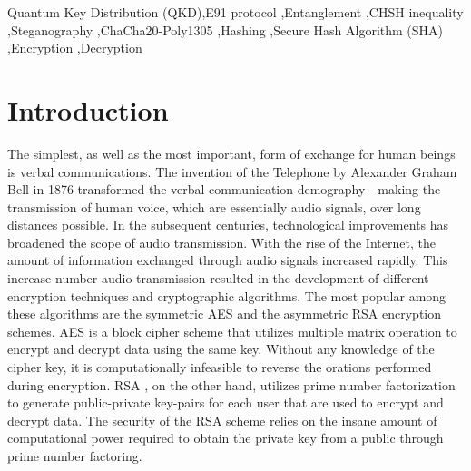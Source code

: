 \documentclass[a4paper]{cas-sc}
\begin{document}
\begin{abstract}
\end{abstract}



\begin{keywords}
    Quantum Key Distribution (QKD)\sep E91 protocol \sep Entanglement \sep CHSH inequality \sep Steganography \sep ChaCha20-Poly1305 \sep Hashing \sep Secure Hash Algorithm (SHA) \sep Encryption \sep Decryption
\end{keywords}


\maketitle


\section{Introduction}
The simplest, as well as the most important, form of exchange for human beings is verbal communications. The invention of the Telephone by Alexander Graham Bell in 1876 transformed the verbal communication demography - making the transmission of human voice, which are essentially audio signals, over long distances possible. In the subsequent centuries, technological improvements has broadened the scope of audio transmission. With the rise of the Internet, the amount of information exchanged through audio signals increased rapidly. This increase number audio transmission resulted in the development of different encryption techniques and cryptographic algorithms. The most popular among these algorithms are the symmetric AES and the asymmetric RSA encryption schemes. AES \cite{rijmen2001advanced} is a block cipher scheme that utilizes multiple matrix operation to encrypt and decrypt data using the same key. Without any knowledge of the cipher key, it is computationally infeasible to reverse the orations performed during encryption. RSA \cite{rivest1978method}, on the other hand, utilizes prime number factorization to generate public-private key-pairs for each user that are used to encrypt and decrypt data. The security of the RSA scheme relies on the insane amount of computational power required to obtain the private key from a public through prime number factoring.
\end{document}
